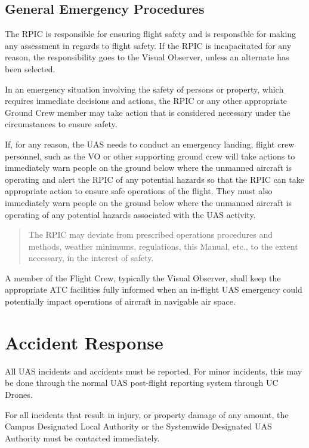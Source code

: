 \documentclass[
]{book}
\begin{document}
\section{General Emergency Procedures}\label{general-emergency-procedures}

The RPIC is responsible for ensuring flight safety and is responsible for making any assessment in regards to flight safety. If the RPIC is incapacitated for any reason, the responsibility goes to the Visual Observer, unless an alternate has been selected.

In an emergency situation involving the safety of persons or property, which requires immediate decisions and actions, the RPIC or any other appropriate Ground Crew member may take action that is considered necessary under the circumstances to ensure safety.

If, for any reason, the UAS needs to conduct an emergency landing, flight crew personnel, such as the VO or other supporting ground crew will take actions to immediately warn people on the ground below where the unmanned aircraft is operating and alert the RPIC of any potential hazards so that the RPIC can take appropriate action to ensure safe operations of the flight. They must also immediately warn people on the ground below where the unmanned aircraft is operating of any potential hazards associated with the UAS activity.

\begin{quote}
The RPIC may deviate from prescribed operations procedures and methods, weather minimums, regulations, this Manual, etc., to the extent necessary, in the interest of safety.
\end{quote}

A member of the Flight Crew, typically the Visual Observer, shall keep the appropriate ATC facilities fully informed when an in-flight UAS emergency could potentially impact operations of aircraft in navigable air space.

\chapter{Accident Response}\label{accident-response}

All UAS incidents and accidents must be reported. For minor incidents, this may be done through the normal UAS post-flight reporting system through UC Drones.

For all incidents that result in injury, or property damage of any amount, the Campus Designated Local Authority or the Systemwide Designated UAS Authority must be contacted immediately.
\end{document}
